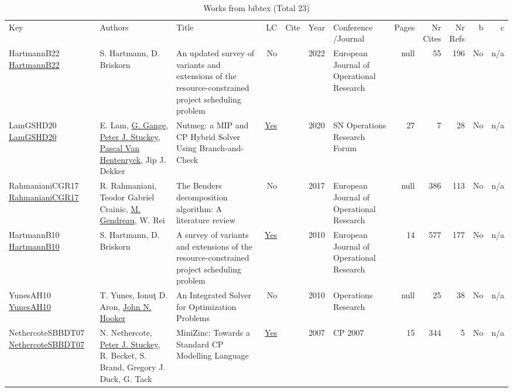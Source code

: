 {\scriptsize
\begin{longtable}{>{\raggedright\arraybackslash}p{3cm}>{\raggedright\arraybackslash}p{6cm}>{\raggedright\arraybackslash}p{6.5cm}rrrp{2.5cm}rrrrr}
\rowcolor{white}\caption{Works from bibtex (Total 23)}\\ \toprule
\rowcolor{white}Key & Authors & Title & LC & Cite & Year & \shortstack{Conference\\/Journal} & Pages & \shortstack{Nr\\Cites} & \shortstack{Nr\\Refs} & b & c \\ \midrule\endhead
\bottomrule
\endfoot
HartmannB22 \href{http://dx.doi.org/10.1016/j.ejor.2021.05.004}{HartmannB22} & S. Hartmann, D. Briskorn & An updated survey of variants and extensions of the resource-constrained project scheduling problem & No & \cite{HartmannB22} & 2022 & European Journal of Operational Research & null & 55 & 196 & No & n/a\\
LamGSHD20 \href{http://dx.doi.org/10.1007/s43069-020-00023-2}{LamGSHD20} & E. Lam, \hyperref[auth:a187]{G. Gange}, \hyperref[auth:a126]{Peter J. Stuckey}, \hyperref[auth:a149]{Pascal Van Hentenryck}, Jip J. Dekker & Nutmeg: a MIP and CP Hybrid Solver Using Branch-and-Check & \href{works/LamGSHD20.pdf}{Yes} & \cite{LamGSHD20} & 2020 & SN Operations Research Forum & 27 & 7 & 28 & No & n/a\\
RahmanianiCGR17 \href{http://dx.doi.org/10.1016/j.ejor.2016.12.005}{RahmanianiCGR17} & R. Rahmaniani, Teodor Gabriel Crainic, \hyperref[auth:a626]{M. Gendreau}, W. Rei & The Benders decomposition algorithm: A literature review & No & \cite{RahmanianiCGR17} & 2017 & European Journal of Operational Research & null & 386 & 113 & No & n/a\\
HartmannB10 \href{http://dx.doi.org/10.1016/j.ejor.2009.11.005}{HartmannB10} & S. Hartmann, D. Briskorn & A survey of variants and extensions of the resource-constrained project scheduling problem & \href{works/HartmannB10.pdf}{Yes} & \cite{HartmannB10} & 2010 & European Journal of Operational Research & 14 & 577 & 177 & No & n/a\\
YunesAH10 \href{http://dx.doi.org/10.1287/opre.1090.0733}{YunesAH10} & T. Yunes, Ionuţ D. Aron, \hyperref[auth:a162]{John N. Hooker} & An Integrated Solver for Optimization Problems & No & \cite{YunesAH10} & 2010 & Operations Research & null & 25 & 38 & No & n/a\\
NethercoteSBBDT07 \href{https://doi.org/10.1007/978-3-540-74970-7\_38}{NethercoteSBBDT07} & N. Nethercote, \hyperref[auth:a126]{Peter J. Stuckey}, R. Becket, S. Brand, Gregory J. Duck, G. Tack & MiniZinc: Towards a Standard {CP} Modelling Language & \href{works/NethercoteSBBDT07.pdf}{Yes} & \cite{NethercoteSBBDT07} & 2007 & CP 2007 & 15 & 344 & 5 & No & n/a\\

\end{longtable}}
